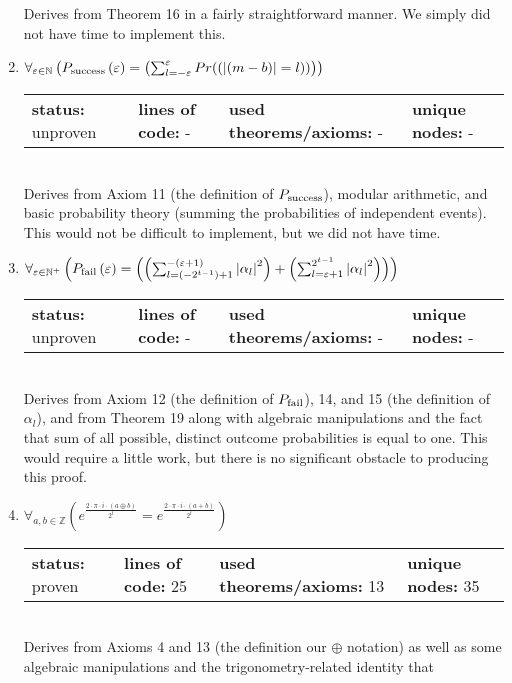 \documentclass{article}[12pt]
\begin{document}
\begin{enumerate}
Derives from Theorem 16 in a fairly straightforward manner.  We simply did not have time to implement this.
\item $\forall_{\varepsilon \in \mathbb{N}} \left(P_{\rm success}\left(\varepsilon\right) = \left(\sum_{l=-\varepsilon}^{\varepsilon} Pr(\left(\left|\left(m - b\right)\right| = l\right))\right)\right)$ \hfill \\
  \begin{tabular}{l | l | l | l}
    \textbf{status:} unproven & \textbf{lines of code:} - & \textbf{used theorems/axioms:} - & \textbf{unique nodes:} -
  \end{tabular} \hfill \\
Derives from Axiom 11 (the definition of $P_{\rm success}$), modular arithmetic, and basic probability theory (summing the probabilities of independent events).  This would not be difficult to implement, but we did not have time.
\item $\forall_{\varepsilon \in \mathbb{N}^+} \left(P_{\rm fail}\left(\varepsilon\right) = \left(\left(\sum_{l=\left(-2^{t - 1}\right) + 1}^{-\left(\varepsilon + 1\right)} \left|\alpha_{l}\right|^{2}\right) + \left(\sum_{l=\varepsilon + 1}^{2^{t - 1}} \left|\alpha_{l}\right|^{2}\right)\right)\right)$ \hfill \\
  \begin{tabular}{l | l | l | l}
    \textbf{status:} unproven & \textbf{lines of code:} - & \textbf{used theorems/axioms:} - & \textbf{unique nodes:} -    
  \end{tabular} \hfill \\
Derives from Axiom 12 (the definition of $P_{\rm fail}$), 14, and 15 (the definition of $\alpha_l$), and from Theorem 19 along with algebraic manipulations and the fact that sum of all possible, distinct outcome probabilities is equal to one.  This would require a little work, but there is no significant obstacle to producing this proof.
\item $\forall_{a, b \in \mathbb{Z}} \left(e^{\frac{2 \cdot \pi \cdot i \cdot \left(a \oplus b\right)}{2^{t}}} = e^{\frac{2 \cdot \pi \cdot i \cdot \left(a + b\right)}{2^{t}}}\right)$ \hfill \\
  \begin{tabular}{l | l | l | l}
    \textbf{status:} proven & \textbf{lines of code:} 25 & \textbf{used theorems/axioms:} 13 & \textbf{unique nodes:} 35
  \end{tabular} \hfill \\
  Derives from Axioms 4 and 13 (the definition our $\oplus$ notation) as well as some algebraic manipulations and the trigonometry-related identity that

\end{enumerate}
\end{document}
